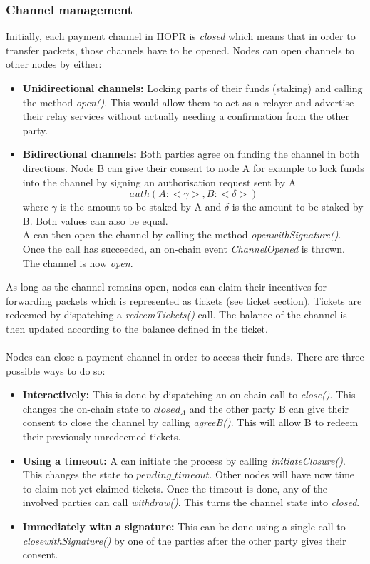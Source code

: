 \subsubsection{Channel management}
Initially, each payment channel in HOPR is \textit{closed} which means that in order to transfer packets, those channels have to be opened. Nodes can open channels to other nodes by either:
\begin{itemize}
    \item \textbf{Unidirectional channels:} Locking parts of their funds (staking) and calling the method \textit{open()}. This would allow them to act as a relayer and advertise their relay services without actually needing a confirmation from the other party.
    \item \textbf{Bidirectional channels:} Both parties agree on funding the channel in both directions. Node B can give their consent to node A for example to lock funds into the channel by signing an authorisation request sent by A $$auth(A: <\gamma>, B: <\delta>)$$ where $\gamma$ is the amount to be staked by A and $\delta$ is the amount to be staked by B. Both values can also be equal. 
    \\ A can then open the channel by calling the method \textit{openwithSignature()}. Once the call has succeeded, an on-chain event \textit{ChannelOpened} is thrown. The channel is now \textit{open}.
\end{itemize} 
As long as the channel remains open, nodes can claim their incentives for forwarding packets which is represented as tickets (see ticket section). Tickets are redeemed by dispatching a \textit{redeemTickets()} call. The balance of the channel is then updated according to the balance defined in the ticket.
\\~\\Nodes can close a payment channel in order to access their funds. There are three possible ways to do so:
\begin{itemize}
    \item \textbf{Interactively:} This is done by dispatching an on-chain call to \textit{close()}. This changes the on-chain state to $closed_A$ and the other party B can give their consent to close the channel by calling \textit{agreeB()}. This will allow B to redeem their previously unredeemed tickets. 
    \item \textbf{Using a timeout:} A can initiate the process by calling \textit{initiateClosure()}. This changes the state to $pending\_timeout$. Other nodes will have now time to claim not yet claimed tickets. Once the timeout is done, any of the involved parties can call \textit{withdraw()}. This turns the channel state into \textit{closed}. 
    \item \textbf{Immediately witn a signature:} This can be done using a single call to \textit{closewithSignature()} by one of the parties after the other party gives their consent. 
\end{itemize}

